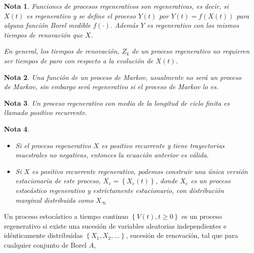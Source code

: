 \documentclass{article}
\newtheorem{Note}{Nota}[section]
\numberwithin{equation}{section}
\begin{document}
{\begin{Note}
Funciones de procesos regenerativos son regenerativas, es decir, si $X\left(t\right)$ es regenerativo y se define el proceso $Y\left(t\right)$ por $Y\left(t\right)=f\left(X\left(t\right)\right)$ para alguna funci\'on Borel medible $f\left(\cdot\right)$. Adem\'as $Y$ es regenerativo con los mismos tiempos de renovaci\'on que $X$. 

En general, los tiempos de renovaci\'on, $Z_{k}$ de un proceso regenerativo no requieren ser tiempos de paro con respecto a la evoluci\'on de $X\left(t\right)$.
\end{Note} 

\begin{Note}
Una funci\'on de un proceso de Markov, usualmente no ser\'a un proceso de Markov, sin embargo ser\'a regenerativo si el proceso de Markov lo es.
\end{Note}

 
\begin{Note}
Un proceso regenerativo con media de la longitud de ciclo finita es llamado positivo recurrente.
\end{Note}


\begin{Note}
\begin{itemize}
\item[a)] Si el proceso regenerativo $X$ es positivo recurrente y tiene trayectorias muestrales no negativas, entonces la ecuaci\'on anterior es v\'alida.
\item[b)] Si $X$ es positivo recurrente regenerativo, podemos construir una \'unica versi\'on estacionaria de este proceso, $X_{e}=\left\{X_{e}\left(t\right)\right\}$, donde $X_{e}$ es un proceso estoc\'astico regenerativo y estrictamente estacionario, con distribuci\'on marginal distribuida como $X_{\infty}$
\end{itemize}
\end{Note}




Un proceso estoc\'astico a tiempo continuo $\left\{V\left(t\right),t\geq0\right\}$ es un proceso regenerativo si existe una sucesi\'on de variables aleatorias independientes e id\'enticamente distribuidas $\left\{X_{1},X_{2},\ldots\right\}$, sucesi\'on de renovaci\'on, tal que para cualquier conjunto de Borel $A$, 

}
\end{document}
